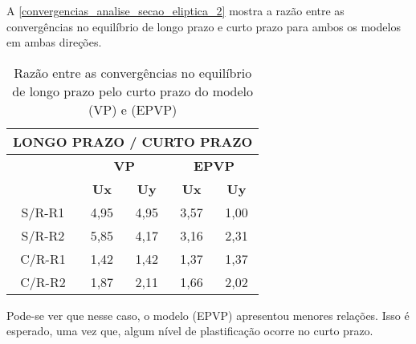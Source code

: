 A \autoref{convergencias_analise_secao_eliptica_2} mostra a razão entre as convergências no equilíbrio de longo prazo e curto prazo para ambos os modelos em ambas direções.

\begin{table}[H]
	\caption{Razão entre as convergências no equilíbrio de longo prazo pelo curto prazo do modelo (VP) e (EPVP)}
	\label{convergencias_analise_secao_eliptica_2}
	\centering
	\small
	\renewcommand{\arraystretch}{1.25}
	\begin{tabular}{c c c c c}
		\hline
		\multicolumn{5}{c}{\textbf{LONGO PRAZO / CURTO PRAZO}}\\	
		\hline
		\multicolumn{1}{c}{} &
		\multicolumn{2}{c}{\textbf{VP}} &
		\multicolumn{2}{c}{\textbf{EPVP}}	\\
		\multicolumn{1}{c}{} &
		\multicolumn{1}{c}{\textbf{Ux}} &
		\multicolumn{1}{c}{\textbf{Uy}} &
		\multicolumn{1}{c}{\textbf{Ux}} &
		\multicolumn{1}{c}{\textbf{Uy}} \\
		\hline
		S/R-R1	 &	4,95 &	4,95 &	3,57 &	1,00 \\
		S/R-R2	 &	5,85 &	4,17 &	3,16 &	2,31 \\
		C/R-R1	 &	1,42 &	1,42 &	1,37 &	1,37 \\
		C/R-R2	 &	1,87 &	2,11 &	1,66 &	2,02 \\
		\hline
	\end{tabular}
	\normalsize
\end{table}

Pode-se ver que nesse caso, o modelo (EPVP) apresentou menores relações. Isso é esperado, uma vez que, algum nível de plastificação ocorre no curto prazo.




